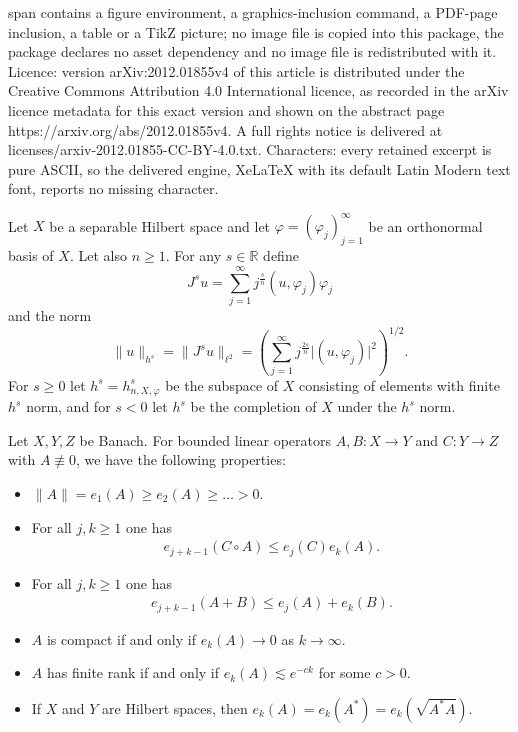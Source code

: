 \documentclass[10pt,a4paper]{amsart}
\newcommand{\abs}[1]{\lvert #1 \rvert}          %
\newcommand{\mR}{\mathbb{R}}                    %
\newcommand{\norm}[1]{\lVert #1 \rVert}         %
\renewcommand{\geq}{\geqslant}
\renewcommand{\leq}{\leqslant}
\begin{document}
span contains a figure environment, a graphics-inclusion command, a PDF-page inclusion, a table or a TikZ picture; no image file is copied into this package, the package declares no asset dependency and no image file is redistributed with it. Licence: version arXiv:2012.01855v4 of this article is distributed under the Creative Commons Attribution 4.0 International licence, as recorded in the arXiv licence metadata for this exact version and shown on the abstract page https://arxiv.org/abs/2012.01855v4. A full rights notice is delivered at licenses/arxiv-2012.01855-CC-BY-4.0.txt. Characters: every retained excerpt is pure ASCII, so the delivered engine, XeLaTeX with its default Latin Modern text font, reports no missing character.
\begin{definition} \label{def_hs_sequence}
Let $X$ be a separable Hilbert space and let $\varphi = (\varphi_j)_{j=1}^{\infty}$ be an orthonormal basis of $X$. Let also $n \geq 1$. For any $s \in \mR$ define 
\[
J^s u =  \sum_{j=1}^{\infty} j^{\frac{s}{n}} (u, \varphi_j) \varphi_j
\]
and the norm 
\[
\norm{u}_{h^s} = \norm{J^s u}_{\ell^2} = \left( \sum_{j=1}^{\infty} j^{\frac{2s}{n}} \abs{(u, \varphi_j)}^2 \right)^{1/2}.
\]
For $s \geq 0$ let $h^s = h^s_{n,X,\varphi}$ be the subspace of $X$ consisting of elements with finite $h^s$ norm, and for $s < 0$ let $h^s$ be the completion of $X$ under the $h^s$ norm.
\end{definition}

\begin{lemma}
\label{lem:prop_entropy}
Let $X,Y,Z$ be Banach. For bounded linear operators $A, B: X \to Y$ and $C: Y \to Z$ with $A \not\equiv 0$, we have the following properties:
\begin{itemize}
\item[(i)] $\|A\| = e_1(A) \geq e_2(A)\geq \ldots > 0$.
\item[(ii)] For all $j,k \geq 1$ one has 
\begin{align*}
e_{j+k-1}(C \circ A) \leq e_j(C) e_k(A).
\end{align*}
\item[(iii)] For all $j,k \geq 1$ one has 
\begin{align*}
e_{j+k-1}(A+B) \leq e_j(A) + e_k(B).
\end{align*}
\item[(iv)] $A$ is compact if and only if $e_k(A) \to 0$ as $k \to \infty$.
\item[(v)] $A$ has finite rank if and only if $e_k(A) \lesssim e^{-ck}$ for some $c > 0$.
\item[(vi)] If $X$ and $Y$ are Hilbert spaces, then $e_k(A) = e_k(A^*) = e_k(\sqrt{A^* A})$.
\end{itemize}
\end{lemma}
\end{document}
